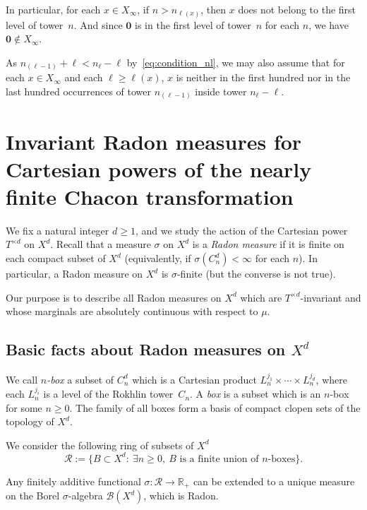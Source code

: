 \documentclass[AHL,Unicode,longabstracts]{cedram}
\newcommand{\egdef}{:=}
\newcommand{\RR}{\mathbb{R}}
\newcommand{\B}{\mathscr{B}}
\newcommand{\cd}{C^{d}}
\newcommand{\td}{T^{\times d}}
\newcommand{\bz}{\boldsymbol{0}}
\let\oldexists\exists
\renewcommand*{\exists}{\mathrel{\oldexists}}
\begin{document}
\begin{rema}\label{remark:first_level}
In particular, for each $x\in X_\infty$, if $n>n_{\ell(x)}$, then $x$ does not belong to the first level of tower~$n$. And since $\bz$ is in the first level of tower~$n$ for each $n$, we have $\bz\notin X_\infty$.
\end{rema}

\begin{rema}\label{remark:1.6}
As $n_{(\ell-1)}+\ell < n_\ell-\ell$ by~\eqref{eq:condition_nl}, we may also assume that for each $x\in X_\infty$ and each $\ell\ge \ell(x)$, $x$ is neither in the first hundred nor in the last hundred occurrences of tower $n_{(\ell-1)}$ inside tower $n_\ell-\ell$.
\end{rema}


\section{Invariant Radon measures for Cartesian powers of the nearly finite Chacon transformation}\label{sec:invariantmeasures}

We fix a natural integer $d\ge1$, and we study the action of the Cartesian power $\td$ on $X^d$. Recall that a measure $\sigma$ on $X^d$ is a \emph{Radon measure} if it is finite on each compact subset of $X^d$ (equivalently, if $\sigma(\cd_n)<\infty$ for each $n$). In particular, a Radon measure on $X^d$ is $\sigma$-finite (but the converse is not true).

Our purpose is to describe all Radon measures on $X^d$ which are $\td$-invariant and whose marginals are absolutely continuous with respect to $\mu$.

\subsection{Basic facts about Radon measures on \texorpdfstring{$X^d$}{Xd}}\label{sec:basicradon}

We call \emph{$n$-box} a subset of $\cd_n$ which is a Cartesian product $L_n^{j_1}\times \cdots\times L_n^{j_d}$, where each $L_n^{j_i}$ is a level of the Rokhlin tower~$C_n$. A \emph{box} is a subset which is an $n$-box for some $n\ge0$. The family of all boxes form a basis of compact clopen sets of the topology of $X^d$.

We consider the following ring of subsets of $X^d$
\[
\mathscr{R}\egdef\{B\subset X^d:\ \exists n\ge0,\ B\text{ is a finite union of $n$-boxes}\}.
\]

\begin{prop}\label{prop:caratheodory-extension}
Any finitely additive functional $\sigma:\mathscr{R}\to\RR_+$ can be extended to a unique measure on the Borel $\sigma$-algebra $\B(X^d)$, which is Radon.
\end{prop}
\end{document}
